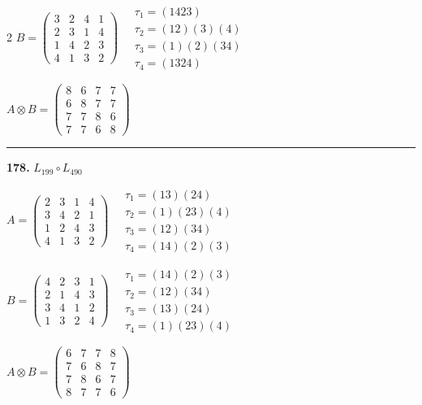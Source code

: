\begin{multicols}{2}
$B = \begin{pmatrix} 3 & 2 & 4 & 1 \\ 2 & 3 & 1 & 4 \\ 1 & 4 & 2 & 3 \\ 4 & 1 & 3 & 2 \end{pmatrix} \quad \begin{matrix} \tau_{1}=(1 4 2 3) \\ \tau_{2}=(1 2)(3)(4) \\ \tau_{3}=(1)(2)(3 4) \\ \tau_{4}=(1 3 2 4) \end{matrix}$

$A \otimes B = \begin{pmatrix} 8 & 6 & 7 & 7 \\ 6 & 8 & 7 & 7 \\ 7 & 7 & 8 & 6 \\ 7 & 7 & 6 & 8 \end{pmatrix}$

\vspace{0.3em}
\hrule
\vspace{0.3em}

\noindent\textbf{178.} $L_{199} \circ L_{490}$

$A = \begin{pmatrix} 2 & 3 & 1 & 4 \\ 3 & 4 & 2 & 1 \\ 1 & 2 & 4 & 3 \\ 4 & 1 & 3 & 2 \end{pmatrix} \quad \begin{matrix} \tau_{1}=(1 3)(2 4) \\ \tau_{2}=(1)(2 3)(4) \\ \tau_{3}=(1 2)(3 4) \\ \tau_{4}=(1 4)(2)(3) \end{matrix}$

$B = \begin{pmatrix} 4 & 2 & 3 & 1 \\ 2 & 1 & 4 & 3 \\ 3 & 4 & 1 & 2 \\ 1 & 3 & 2 & 4 \end{pmatrix} \quad \begin{matrix} \tau_{1}=(1 4)(2)(3) \\ \tau_{2}=(1 2)(3 4) \\ \tau_{3}=(1 3)(2 4) \\ \tau_{4}=(1)(2 3)(4) \end{matrix}$

$A \otimes B = \begin{pmatrix} 6 & 7 & 7 & 8 \\ 7 & 6 & 8 & 7 \\ 7 & 8 & 6 & 7 \\ 8 & 7 & 7 & 6 \end{pmatrix}$


\end{multicols}

